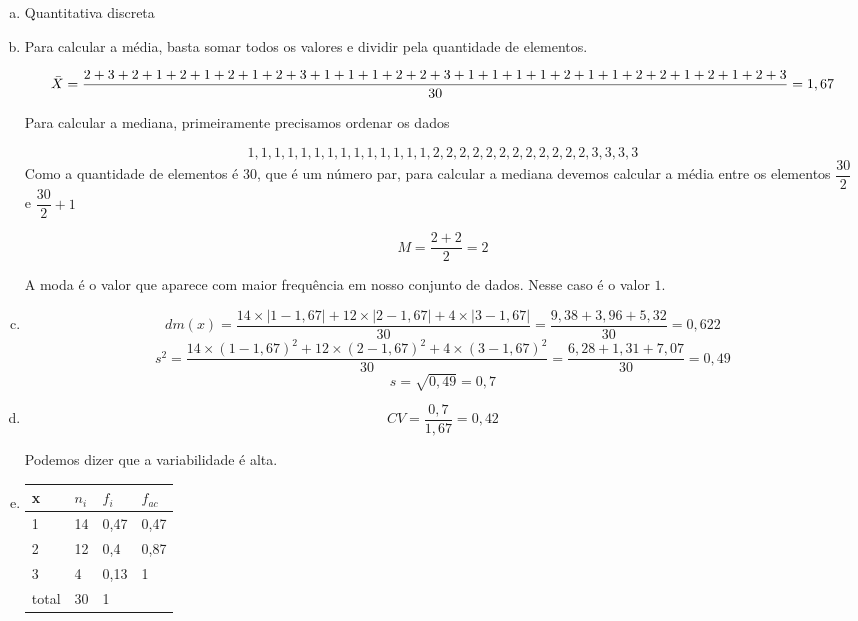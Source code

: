 \documentclass{article}
\begin{document}
\begin{enumerate}[a)]
\item Quantitativa discreta
\item 

Para calcular a média, basta somar todos os valores e dividir pela quantidade de elementos.

{\tiny $$\Bar{X} = \dfrac{2+ 3+ 2+ 1+ 2+ 1+ 2+ 1+ 2+ 3+ 1+ 1+ 1+ 2+ 2+ 3+ 1+ 1+ 1+ 1+ 2+ 1+ 1+ 2+ 2+ 1+ 2+
1 +2+ 3}{30} = 1,67$$}

Para calcular a mediana, primeiramente precisamos ordenar os dados

$$1, 1, 1, 1, 1, 1, 1, 1, 1, 1, 1, 1, 1, 1, 2, 2, 2, 2, 2, 2, 2, 2, 2, 2, 2, 2, 3, 3, 3, 3$$
Como a quantidade de elementos é 30, que é um número par, para calcular a mediana devemos calcular a média entre os elementos $\dfrac{30}{2}$ e $\dfrac{30}{2} +1$

$$M = \dfrac{2+2}{2}=2$$

A moda é o valor que aparece com maior frequência em nosso conjunto de dados. Nesse caso é o valor $1$.

\item 
$$dm(x) = \dfrac{14 \times |1 - 1,67| + 12 \times |2 - 1,67| + 4 \times |3-1,67|}{30} = \dfrac{9,38+ 3,96 + 5,32}{30} = 0,622 $$
$$s^2 =  \dfrac{14 \times (1 - 1,67)^2 + 12 \times (2 - 1,67)^2 + 4 \times (3-1,67)^2}{30} = \dfrac{6,28 + 1,31 + 7,07}{30} = 0,49$$
$$s = \sqrt{0,49} = 0,7$$
\item 
$$CV = \dfrac{0,7}{1,67} = 0,42$$

Podemos dizer que a variabilidade é alta.
\item 

\begin{table}[ht]
\centering
\begin{tabular}{llll}
\hline
x     & $n_i$ & $f_i$ & $f_{ac}$ \\ \hline
1     & 14    & 0,47  & 0,47     \\
2     & 12    & 0,4   & 0,87     \\
3     & 4     & 0,13  & 1        \\
total & 30    & 1     &          \\ \hline
\end{tabular}
\end{table}
\end{enumerate}
\end{document}
